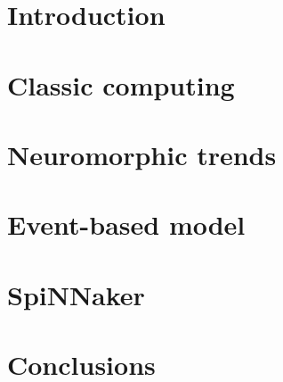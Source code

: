 \section{Introduction}
\section{Classic computing}
\section{Neuromorphic trends}
\section{Event-based model}
\section{SpiNNaker}
\section{Conclusions}